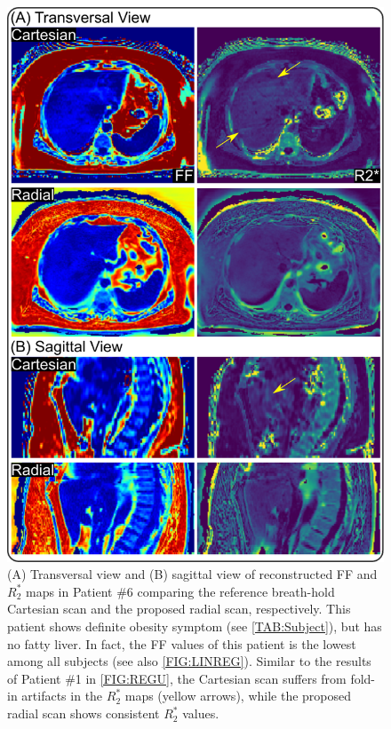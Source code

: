 \documentclass[journal,twoside,web]{ieeecolor}
\begin{document}
\begin{figure}
	\centering
	\includegraphics[width=\columnwidth]{../../figures/tan8.pdf}
	\caption{(A) Transversal view and (B) sagittal view 
		of reconstructed FF and $R_2^*$ maps in Patient \#6 
		comparing the reference breath-hold Cartesian scan and 
		the proposed radial scan, respectively. 
		This patient shows definite obesity symptom 
		(see \cref{TAB:Subject}), but has no fatty liver. 
		In fact, the FF values of this patient is the lowest 
		among all subjects (see also \cref{FIG:LINREG}). 
		Similar to the results of Patient \#1 in \cref{FIG:REGU}, 
		the Cartesian scan suffers from fold-in artifacts in the $R_2^*$ maps 
		(yellow arrows), while the proposed radial scan shows consistent $R_2^*$ values.}
	\label{FIG:LPDFF}
\end{figure}
\end{document}
